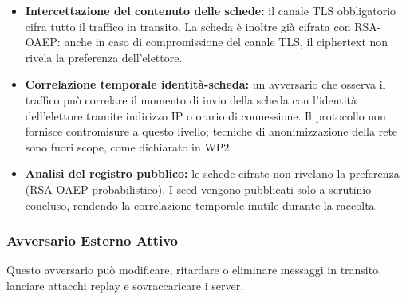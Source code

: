 \documentclass[12pt,a4paper]{article}
\begin{document}
\begin{itemize}
  \item \textbf{Intercettazione del contenuto delle schede:} il canale TLS obbligatorio cifra tutto il traffico in transito. La scheda è inoltre già cifrata con RSA-OAEP: anche in caso di compromissione del canale TLS, il ciphertext non rivela la preferenza dell'elettore.
  \item \textbf{Correlazione temporale identità-scheda:} un avversario che osserva il traffico può correlare il momento di invio della scheda con l'identità dell'elettore tramite indirizzo IP o orario di connessione. Il protocollo non fornisce contromisure a questo livello; tecniche di anonimizzazione della rete sono fuori scope, come dichiarato in WP2.
  \item \textbf{Analisi del registro pubblico:} le schede cifrate non rivelano la preferenza (RSA-OAEP probabilistico). I seed vengono pubblicati solo a scrutinio concluso, rendendo la correlazione temporale inutile durante la raccolta.
\end{itemize}

\subsubsection{Avversario Esterno Attivo}

Questo avversario può modificare, ritardare o eliminare messaggi in transito, lanciare attacchi replay e sovraccaricare i server.
\end{document}
